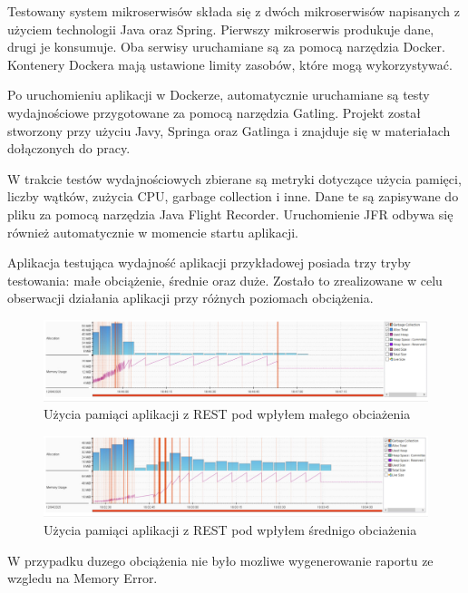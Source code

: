 \documentclass[runningheads,12pt]{llncs}
\begin{document}
Testowany system mikroserwisów składa się z dwóch mikroserwisów napisanych z użyciem technologii Java oraz Spring. Pierwszy mikroserwis produkuje dane, drugi je konsumuje. Oba serwisy uruchamiane są za pomocą narzędzia Docker. Kontenery Dockera mają ustawione limity zasobów, które mogą wykorzystywać.

Po uruchomieniu aplikacji w Dockerze, automatycznie uruchamiane są testy wydajnościowe przygotowane za pomocą narzędzia Gatling. Projekt został stworzony przy użyciu Javy, Springa oraz Gatlinga i znajduje się w materiałach dołączonych do pracy.

W trakcie testów wydajnościowych zbierane są metryki dotyczące użycia pamięci, liczby wątków, zużycia CPU, garbage collection i inne. Dane te są zapisywane do pliku za pomocą narzędzia Java Flight Recorder. Uruchomienie JFR odbywa się również automatycznie w momencie startu aplikacji.

Aplikacja testująca wydajność aplikacji przykładowej posiada trzy tryby testowania: małe obciążenie, średnie oraz duże. Zostało to zrealizowane w celu obserwacji działania aplikacji przy różnych poziomach obciążenia.


\begin{figure}
    \includegraphics[width=\linewidth]{images/rest-memory-low-graph.jpg}
    \caption{Użycia pamiąci aplikacji z REST pod wpłyłem małego obciażenia} \label{fig1}
\end{figure}

\begin{figure}
    \includegraphics[width=\linewidth]{images/rest-memory-middle-graph.jpg}
    \caption{Użycia pamiąci aplikacji z REST pod wpłyłem średnigo obciażenia} \label{fig1}
\end{figure}

W przypadku duzego obciążenia nie było mozliwe wygenerowanie raportu ze wzgledu na Memory Error.
\end{document}
